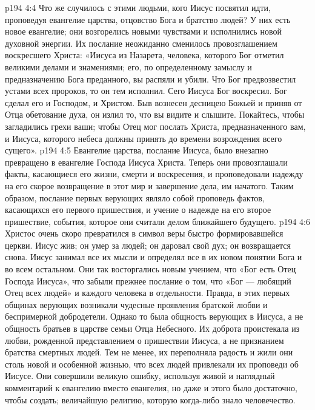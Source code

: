 \vs p194 4:4 \pc Что же случилось с этими людьми, кого Иисус посвятил идти, проповедуя евангелие царства, отцовство Бога и братство людей? У них есть новое евангелие; они возгорелись новыми чувствами и исполнились новой духовной энергии. Их послание неожиданно сменилось провозглашением воскресшего Христа: «Иисуса из Назарета, человека, которого Бог отметил великими делами и знамениями; его, по определенному замыслу и предназначению Бога преданного, вы распяли и убили. Что Бог предвозвестил устами всех пророков, то он тем исполнил. Сего Иисуса Бог воскресил. Бог сделал его и Господом, и Христом. Быв вознесен десницею Божьей и приняв от Отца обетование духа, он излил то, что вы видите и слышите. Покайтесь, чтобы загладились грехи ваши; чтобы Отец мог послать Христа, предназначенного вам, и Иисуса, которого небеса должны принять до времени возрождения всего сущего».
\vs p194 4:5 Евангелие царства, послание Иисуса, было внезапно превращено в евангелие Господа Иисуса Христа. Теперь они провозглашали факты, касающиеся его жизни, смерти и воскресения, и проповедовали надежду на его скорое возвращение в этот мир и завершение дела, им начатого. Таким образом, послание первых верующих являло собой проповедь фактов, касающихся его первого пришествия, и учение о надежде на его второе пришествие, события, которое они считали делом ближайшего будущего.
\vs p194 4:6 Христос очень скоро превратился в символ веры быстро формировавшейся церкви. Иисус жив; он умер за людей; он даровал свой дух; он возвращается снова. Иисус занимал все их мысли и определял все в их новом понятии Бога и во всем остальном. Они так восторгались новым учением, что «Бог есть Отец Господа Иисуса», что забыли прежнее послание о том, что «Бог --- любящий Отец всех людей» и каждого человека в отдельности. Правда, в этих первых общинах верующих возникали чудесные проявления братской любви и беспримерной добродетели. Однако то была общность верующих в Иисуса, а не общность братьев в царстве семьи Отца Небесного. Их доброта проистекала из любви, рожденной представлением о пришествии Иисуса, а не признанием братства смертных людей. Тем не менее, их переполняла радость и жили они столь новой и особенной жизнью, что всех людей привлекали их проповеди об Иисусе. Они совершили великую ошибку, используя живой и наглядный комментарий к евангелию вместо евангелия, но даже и этого было достаточно, чтобы создать; величайшую религию, которую когда\hyp{}либо знало человечество.
